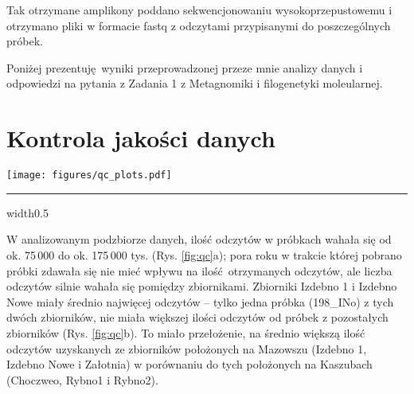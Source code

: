 \documentclass[two column, twoside, a4paper]{article}
\begin{document}
Tak otrzymane amplikony poddano sekwencjonowaniu wysokoprzepustowemu i otrzymano pliki w formacie fastq z odczytami przypisanymi do poszczególnych próbek.

Poniżej prezentuję wyniki przeprowadzonej przeze mnie analizy danych i odpowiedzi na pytania z Zadania 1 z Metagnomiki i filogenetyki moleularnej.

\section{Kontrola jakości danych}

\begin{figure*}[ht]
  \begin{center}
    \texttt{[image: figures/qc\_plots.pdf]}
  \end{center}

  \hrule width0.5\textwidth \vspace{0.35em}

  \caption{\textbf{Wyniki analizy jakości danych.} \textbf{a.} Wykres słupkowy przedstawiający ilość odczytów w poszczególnych plikach; kolory oznaczają zbiornik z którego została pobrana dana próbka. \textbf{b.} Wykresy pudełkowe przestawiające rozproszenie i kształt rozkładu ilości odczytów pogrupowanej po: zbiornikach, rejonach polski i porach roku. \textbf{c.} Histogram i wykres pudełkowy przedstawiające długości odczytów, pogrupowane po odczytach foraward i reverse. \textbf{d.} Procent odczytów, w których obecna była sekwencja startera, dla wszystkich próbek; słupki błędów reprezentują różnice między odczytami forward i reverse dla danej próbki. \textbf{e.} Średnia jakość odczytów na danej pozycji w odczycie, dla wszystkich próbek.}
  \label{fig:qc}
\end{figure*}


W analizowanym podzbiorze danych, ilość odczytów w próbkach wahała się od ok. 75\,000 do ok. 175\,000 tys. (Rys. \ref{fig:qc}a); pora roku w trakcie której pobrano próbki zdawała się nie mieć wpływu na ilość otrzymanych odczytów, ale liczba odczytów silnie wahała się pomiędzy zbiornikami. Zbiorniki Izdebno 1 i Izdebno Nowe miały średnio najwięcej odczytów -- tylko jedna próbka (198\_INo) z tych dwóch zbiorników, nie miała większej ilości odczytów od próbek z pozostałych zbiorników (Rys. \ref{fig:qc}b). To miało przełożenie, na średnio większą ilość odczytów uzyskanych ze zbiorników położonych na Mazowszu (Izdebno 1, Izdebno Nowe i Załotnia) w porównaniu do tych położonych na Kaszubach (Choczweo, Rybno1 i Rybno2).
\end{document}
